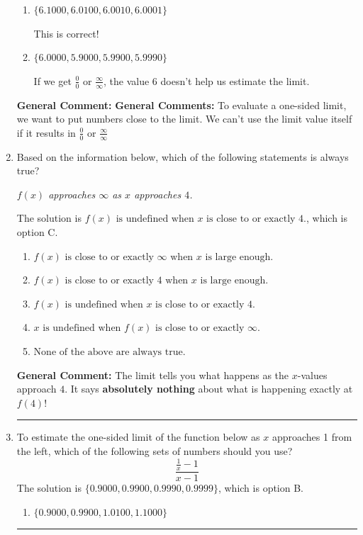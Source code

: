 \documentclass{extbook}[14pt]
\newcommand{\litem}[1]{\item #1

\rule{\textwidth}{0.4pt}}
\begin{document}
\begin{enumerate}
{\begin{enumerate}[label=\Alph*.]
These values would estimate the limit at the point and not a one-sided limit.
\item \( \{ 6.1000, 6.0100, 6.0010, 6.0001 \} \)

This is correct!
\item \( \{ 6.0000, 5.9000, 5.9900, 5.9990 \} \)

If we get $\frac{0}{0}$ or $\frac{\infty}{\infty}$, the value 6 doesn't help us estimate the limit.
\end{enumerate}

\textbf{General Comment:} \textbf{General Comments:} To evaluate a one-sided limit, we want to put numbers close to the limit. We can't use the limit value itself if it results in $\frac{0}{0}$ or $\frac{\infty}{\infty}$
}
\litem{
Based on the information below, which of the following statements is always true?

\begin{center}
    \textit{ $f(x)$ approaches $\infty$ as $x$ approaches $4$. }
\end{center}
The solution is \( f(x) \text{ is undefined when } x \text{ is close to or exactly } 4. \), which is option C.\begin{enumerate}[label=\Alph*.]
\item \( f(x) \text{ is close to or exactly } \infty \text{ when } x \text{ is large enough}. \)


\item \( f(x) \text{ is close to or exactly } 4 \text{ when } x \text{ is large enough}. \)


\item \( f(x) \text{ is undefined when } x \text{ is close to or exactly } 4. \)


\item \( x \text{ is undefined when } f(x) \text{ is close to or exactly } \infty. \)


\item \( \text{None of the above are always true.} \)


\end{enumerate}

\textbf{General Comment:} The limit tells you what happens as the $x$-values approach $4$. It says \textbf{absolutely nothing} about what is happening exactly at $f(4)$!
}
\litem{
To estimate the one-sided limit of the function below as $x$ approaches 1 from the left, which of the following sets of numbers should you use?
\[ \frac{\frac{1}{x} - 1}{x - 1} \]The solution is \( \{ 0.9000, 0.9900, 0.9990, 0.9999 \} \), which is option B.\begin{enumerate}[label=\Alph*.]
\item \( \{ 0.9000, 0.9900, 1.0100, 1.1000 \} \)


\end{enumerate}}
\end{enumerate}
\end{document}
